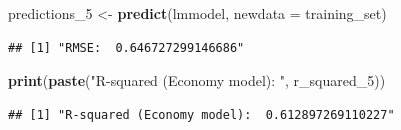 \documentclass[
  11pt,
]{article}
\newenvironment{Shaded}{\begin{snugshade}}{\end{snugshade}}
\newcommand{\AttributeTok}[1]{\textcolor[rgb]{0.13,0.29,0.53}{#1}}
\newcommand{\DecValTok}[1]{\textcolor[rgb]{0.00,0.00,0.81}{#1}}
\newcommand{\FunctionTok}[1]{\textcolor[rgb]{0.13,0.29,0.53}{\textbf{#1}}}
\newcommand{\NormalTok}[1]{#1}
\newcommand{\OtherTok}[1]{\textcolor[rgb]{0.56,0.35,0.01}{#1}}
\newcommand{\SpecialCharTok}[1]{\textcolor[rgb]{0.81,0.36,0.00}{\textbf{#1}}}
\newcommand{\StringTok}[1]{\textcolor[rgb]{0.31,0.60,0.02}{#1}}
\begin{document}
\begin{Shaded}
\begin{Highlighting}[]
\NormalTok{predictions\_5 }\OtherTok{\textless{}{-}} \FunctionTok{predict}\NormalTok{(lmmodel, }\AttributeTok{newdata =}\NormalTok{ training\_set)}
\end{Highlighting}
\end{Shaded}

\begin{Shaded}
\end{Shaded}

\begin{verbatim}
## [1] "RMSE:  0.646727299146686"
\end{verbatim}

\begin{Shaded}
\end{Shaded}

\begin{Shaded}
\begin{Highlighting}[]
\FunctionTok{print}\NormalTok{(}\FunctionTok{paste}\NormalTok{(}\StringTok{"R{-}squared (Economy model): "}\NormalTok{, r\_squared\_5))}
\end{Highlighting}
\end{Shaded}

\begin{verbatim}
## [1] "R-squared (Economy model):  0.612897269110227"
\end{verbatim}
\end{document}

